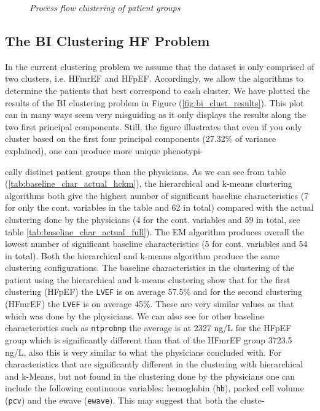 \documentclass[../thesis.tex]{subfiles}
\begin{document}
\begin{figure}
    \centering
    
    \caption[Process flow clustering of patient groups]{\textit{Process flow clustering of patient groups}}
    \label{fig:process_flow_clustering}
\end{figure}

\subsection{The BI Clustering HF Problem}
\label{subsec:bi_clust}

In the current clustering problem we assume that the dataset is only comprised of two clusters, i.e. HFmrEF and HFpEF. Accordingly, we allow the algorithms to determine the patients that best correspond to each cluster. We have plotted the results of the BI clustering problem in Figure (\ref{fig:bi_clust_results}). This plot can in many ways seem very misguiding as it only displays the results along the two first principal components. Still, the figure illustrates that even if you only cluster based on the first four principal components (27.32\% of variance explained), one can produce more unique phenotypi-     





\noindent cally distinct patient groups than the physicians. As we can see from table (\ref{tab:baseline_char_actual_hckm}), the hierarchical and k-means clustering algorithms both give the highest number of significant baseline characteristics (7 for only the cont. variables in the table and 62 in total) compared with the actual clustering done by the physicians (4 for the cont. variables and 59 in total, see table \ref{tab:baseline_char_actual_full}). The EM algorithm produces overall the lowest number of significant baseline characteristics (5 for cont. variables and 54 in total). Both the hierarchical and k-means algorithm produce the same clustering configurations. The baseline characteristics in the clustering of the patient using the hierarchical and k-means clustering show that for the first clustering (HFpEF) the \texttt{LVEF} is on average 57.5\% and for the second clustering (HFmrEF) the \texttt{LVEF} is on average 45\%. These are very similar values as that which was done by the physicians. We can also see for other baseline characteristics such as \texttt{ntprobnp} the average is at 2327 ng/L for the HFpEF group which is significantly different than that of the HFmrEF group 3723.5 ng/L, also this is very similar to what the physicians concluded with. For characteristics that are significantly different in the clustering with hierarchical and k-Means, but not found in the clustering done by the physicians one can include the following continuous variables: hemoglobin (\texttt{hb}), packed cell volume (\texttt{pcv}) and the ewave (\texttt{ewave}). This may suggest that both the cluste-    
\end{document}
